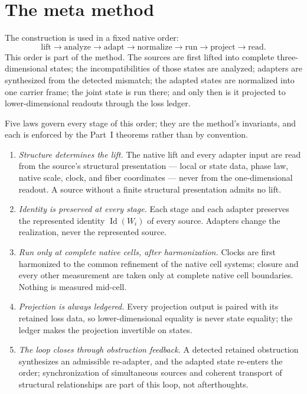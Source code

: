 \documentclass[11pt]{article}
\theoremstyle{definition}
\begin{document}
\section{The meta method}\label{sec:meta-method}

The construction is used in a fixed native order:
\[
\boxed{
\text{lift}
\to
\text{analyze}
\to
\text{adapt}
\to
\text{normalize}
\to
\text{run}
\to
\text{project}
\to
\text{read}.
}
\]
This order is part of the method.  The sources are first lifted into complete
three-dimensional states; the incompatibilities of those states are analyzed;
adapters are synthesized from the detected mismatch; the adapted states are
normalized into one carrier frame; the joint state is run there; and only then
is it projected to lower-dimensional readouts through the loss ledger.

Five laws govern every stage of this order; they are the method's invariants,
and each is enforced by the Part~I theorems rather than by convention.

\begin{enumerate}
\item \emph{Structure determines the lift.}  The native lift and every
adapter input are read from the source's structural presentation --- local or
state data, phase law, native scale, clock, and fiber coordinates --- never
from the one-dimensional readout.  A source without a finite structural
presentation admits no lift.
\item \emph{Identity is preserved at every stage.}  Each stage and each
adapter preserves the represented identity \(\operatorname{Id}(W_i)\) of
every source.  Adapters change the realization, never the represented source.
\item \emph{Run only at complete native cells, after harmonization.}  Clocks
are first harmonized to the common refinement of the native cell systems;
closure and every other measurement are taken only at complete native cell
boundaries.  Nothing is measured mid-cell.
\item \emph{Projection is always ledgered.}  Every projection output is
paired with its retained loss data, so lower-dimensional equality is never
state equality; the ledger makes the projection invertible on states.
\item \emph{The loop closes through obstruction feedback.}  A detected
retained obstruction synthesizes an admissible re-adapter, and the adapted
state re-enters the order; synchronization of simultaneous sources and
coherent transport of structural relationships are part of this loop, not
afterthoughts.
\end{enumerate}
\end{document}
